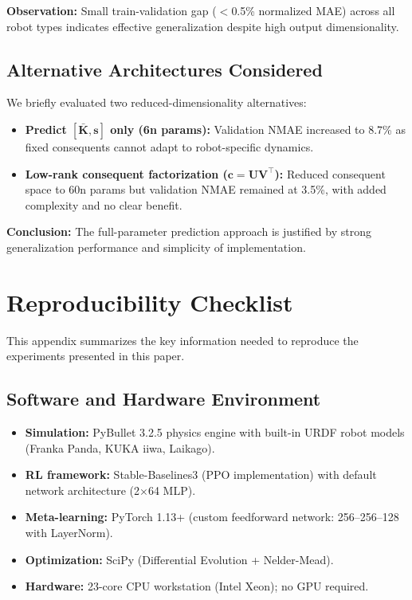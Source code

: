 \documentclass[DTMColor]{ROB-New}
\begin{document}
\textbf{Observation:} Small train-validation gap ($<$0.5\% normalized MAE) across all robot types indicates effective generalization despite high output dimensionality.

\subsection{Alternative Architectures Considered}

We briefly evaluated two reduced-dimensionality alternatives:
\begin{itemize}[leftmargin=*, itemsep=1pt]
    \item \textbf{Predict $[\bar{\bm{K}}, \bm{s}]$ only (6n params):} Validation NMAE increased to 8.7\% as fixed consequents cannot adapt to robot-specific dynamics.
    \item \textbf{Low-rank consequent factorization ($\bm{c} = \bm{U}\bm{V}^\top$):} Reduced consequent space to 60n params but validation NMAE remained at 3.5\%, with added complexity and no clear benefit.
\end{itemize}

\textbf{Conclusion:} The full-parameter prediction approach is justified by strong generalization performance and simplicity of implementation.

\newpage
\section{Reproducibility Checklist}
\label{app:repro_checklist}

This appendix summarizes the key information needed to reproduce the experiments presented in this paper.

\subsection{Software and Hardware Environment}
\begin{itemize}[leftmargin=*, itemsep=2pt]
    \item \textbf{Simulation:} PyBullet 3.2.5 physics engine with built-in URDF robot models (Franka Panda, KUKA iiwa, Laikago).
    \item \textbf{RL framework:} Stable-Baselines3 (PPO implementation) with default network architecture (2$\times$64 MLP).
    \item \textbf{Meta-learning:} PyTorch 1.13+ (custom feedforward network: 256--256--128 with LayerNorm).
    \item \textbf{Optimization:} SciPy (Differential Evolution + Nelder-Mead).
    \item \textbf{Hardware:} 23-core CPU workstation (Intel Xeon); no GPU required.
\end{itemize}
\end{document}
